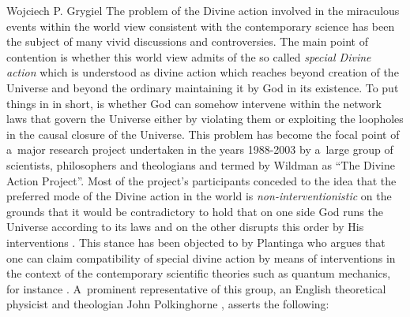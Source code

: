 \begin{artengenv}{Wojciech P. Grygiel}
The problem of the Divine action involved in the miraculous events within the world view consistent with the contemporary science has been the subject of many vivid discussions and controversies. The main point of contention is whether this world view admits of the so called \textit{special Divine action} which is understood as divine action which reaches beyond creation of the Universe and beyond the ordinary maintaining it by God in its existence. To put things in in short, is whether God can somehow intervene within the network laws that govern the Universe either by violating them or exploiting the loopholes in the causal closure of the Universe. This problem has become the focal point of a~major research project undertaken in the years 1988-2003 by a~large group of scientists, philosophers and theologians and termed by Wildman
\parencite*[][]{wildman_divine_2004} %
 as ``The Divine Action Project''. Most of the project’s participants conceded to the idea that the preferred mode of the Divine action in the world is \textit{non-interventionistic} on the grounds that it would be contradictory to hold that on one side God runs the Universe according to its laws and on the other disrupts this order by His interventions 
\parencites[e.g.][]{peacocke_gods_1995}[][]{russell_divine_2001}. %
 This stance has been objected to by Plantinga who argues that one can claim compatibility of special divine action by means of interventions in the context of the contemporary scientific theories such as quantum mechanics, for instance 
\parencite[][]{plantinga_what_2008}. %
 A~prominent representative of this group, an English theoretical physicist and theologian John Polkinghorne 
\parencite*[][p.92]{polkinghorne_science_1998}, %
 asserts the following:

\end{artengenv}
